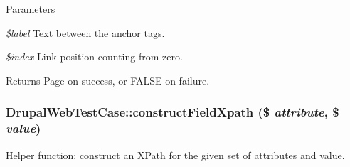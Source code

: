 \begin{DoxyParams}{Parameters}
\item[{\em \$label}]Text between the anchor tags. \item[{\em \$index}]Link position counting from zero. \end{DoxyParams}
\begin{DoxyReturn}{Returns}
Page on success, or FALSE on failure. 
\end{DoxyReturn}
\hypertarget{classDrupalWebTestCase_afec52d7a3b6e492c3230dcc2b22bd7bb}{
\subsubsection[{constructFieldXpath}]{\setlength{\rightskip}{0pt plus 5cm}DrupalWebTestCase::constructFieldXpath (\$ {\em attribute}, \/  \$ {\em value})}}
\label{classDrupalWebTestCase_afec52d7a3b6e492c3230dcc2b22bd7bb}
Helper function: construct an XPath for the given set of attributes and value.


